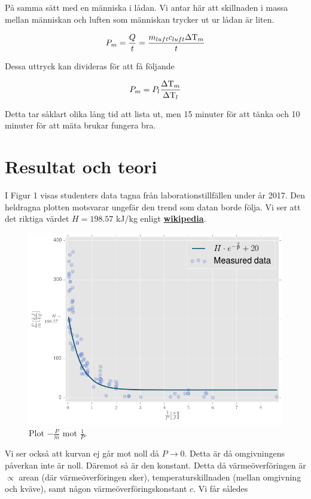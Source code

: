 \documentclass[11pt]{article}
\begin{document}
På samma sätt med en människa i lådan. Vi antar här att skillnaden i massa mellan människan och luften som människan trycker ut ur lådan är liten.

\begin{equation*}
    P_m = \frac{Q}{t} = \frac{m_{luft} c_{luft} \Delta \text T_m}{t}
\end{equation*}

Dessa uttryck kan divideras för att få följande

\begin{equation*}
    P_m = P_l \frac{\Delta \text T_m}{\Delta \text T_l}
\end{equation*}

Detta tar såklart olika lång tid att lista ut, men 15 minuter för att tänka och 10 minuter för att mäta brukar fungera bra.

\section{Resultat och teori}

I Figur 1 visas studenters data tagna från laborationstillfällen under år 2017. Den heldragna plotten motsvarar ungefär den trend som datan borde följa. Vi ser att det riktiga värdet $H = 198.57$ kJ/kg enligt \href{https://en.wikipedia.org/wiki/Nitrogen}{\textbf{wikipedia}}.

\begin{figure}[h]
\center
    \includegraphics[width = .75\linewidth]{nitrogenEnthalpy.png}
    \caption{Plot $- \frac{P}{\dot m}$ mot $\frac{1}{P}$.}
\label{Fig: HCurve}
\end{figure}

Vi ser också att kurvan ej går mot noll då $P \to 0$. Detta är då omgivningens påverkan inte är noll. Däremot så är den konstant. Detta då värmeöverföringen är $\propto$ arean (där värmeöverföringen sker), temperaturskillnaden (mellan omgivning och kväve), samt någon värmeöverföringskonstant $c$. Vi får således
\end{document}
